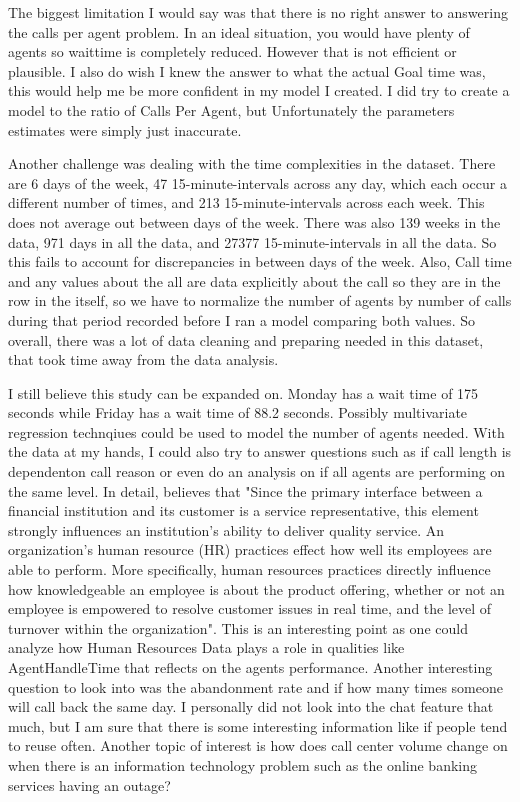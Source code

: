 \documentclass[12pt]{article}
\begin{document}
  The biggest limitation I would say was that there is no right answer to answering the calls per agent problem. In an ideal situation, you would have
plenty of agents so waittime is completely reduced. However that is not efficient or plausible. I also do wish I knew the answer to what
the actual Goal time was, this would help me be more confident in my model I created. I did try to create a model to the ratio of Calls Per Agent,
but Unfortunately the parameters estimates were simply just inaccurate. 

Another challenge was dealing with the time complexities in the dataset. There are 6 days of the week, 47 15-minute-intervals across any day, which each occur a different number of times,
and 213 15-minute-intervals across each week. This does not average out between days of the week. There was also 139 weeks in the data, 971 days in all the data, and
27377 15-minute-intervals in all the data. So this fails to account for discrepancies in between days of the week. Also, Call time and any values
about the all are data explicitly about the call so they are in the row in the itself, so we have to normalize the number of agents by number of calls during
that period recorded before I ran a model comparing both values. So overall, there was a lot of data cleaning and preparing needed in this dataset, that
took time away from the data analysis.

  I still believe this study can be expanded on. Monday has a wait time of 175 seconds while Friday has a wait time of 88.2 seconds. Possibly multivariate regression technqiues could be used to model the number of agents needed.
With the data at my hands, I could also try to answer questions such as if call length is dependenton call reason or even do an analysis on if all agents are performing
on the same level. In detail, \citep{evensen1999effective} believes that "Since the primary interface between a financial institution and its customer is a service
representative, this element strongly influences an institution's ability to deliver quality service. An organization’s human resource (HR) practices effect how well its employees are able to perform. More
specifically, human resources practices directly influence how knowledgeable an employee is about the product offering, whether or not an employee is empowered to resolve customer issues in real time, and the
level of turnover within the organization". This is an interesting point as one could analyze how Human Resources Data plays a role in qualities like AgentHandleTime that reflects on the agents performance. Another interesting question to look into was the abandonment 
rate and if how many times someone will call back the same day. I personally did not look into the chat feature that much, but I am sure that there is some interesting information like if people tend to reuse often.
Another topic of interest is how does call center volume change on when there is an information technology problem such as the online banking services having an outage?



\end{document}
